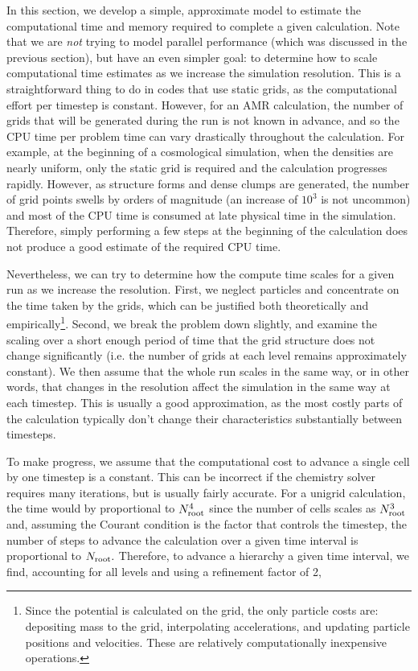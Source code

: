 In this section, we develop a simple, approximate model to estimate
the computational time and memory required to complete a given
calculation.  Note that we are {\it not} trying to model parallel
performance (which was discussed in the previous section), but have an
even simpler goal: to determine how to scale computational time
estimates as we increase the simulation resolution.  This is a
straightforward thing to do in codes that use static grids, as the
computational effort per timestep is constant.  However, for an AMR
calculation, the number of grids that will be generated during the run
is not known in advance, and so the CPU time per problem time can vary
drastically throughout the calculation.  For example, at the beginning
of a cosmological simulation, when the densities are nearly uniform,
only the static grid is required and the calculation progresses
rapidly.  However, as structure forms and dense clumps are generated,
the number of grid points swells by orders of magnitude (an increase
of $10^3$ is not uncommon) and most of the CPU time is consumed at
late physical time in the simulation.  Therefore, simply performing a
few steps at the beginning of the calculation does not produce a good
estimate of the required CPU time.

Nevertheless, we can try to determine how the compute time scales for
a given run as we increase the resolution.  First, we neglect
particles and concentrate on the time taken by the grids, which can be
justified both theoretically and empirically\footnote{Since the
potential is calculated on the grid, the only particle costs are:
depositing mass to the grid, interpolating accelerations, and updating
particle positions and velocities.  These are relatively
computationally inexpensive operations.}.  Second, we break the
problem down slightly, and examine the scaling over a short enough
period of time that the grid structure does not change significantly
(i.e. the number of grids at each level remains approximately
constant).  We then assume that the whole run scales in the same way,
or in other words, that changes in the resolution affect the
simulation in the same way at each timestep.  This is usually a good
approximation, as the most costly parts of the calculation typically
don't change their characteristics substantially between timesteps.

To make progress, we assume that the computational cost to advance a
single cell by one timestep is a constant.  This can be incorrect if
the chemistry solver requires many iterations, but is usually fairly
accurate.  For a unigrid calculation, the time would by proportional
to $N_{\rm root}^4$ since the number of cells scales as $N_{\rm
root}^3$ and, assuming the Courant condition is the factor that
controls the timestep, the number of steps to advance the calculation
over a given time interval is proportional to $N_{\rm root}.$
Therefore, to advance a hierarchy a given time interval, we find,
accounting for all levels and using a refinement factor of 2,


